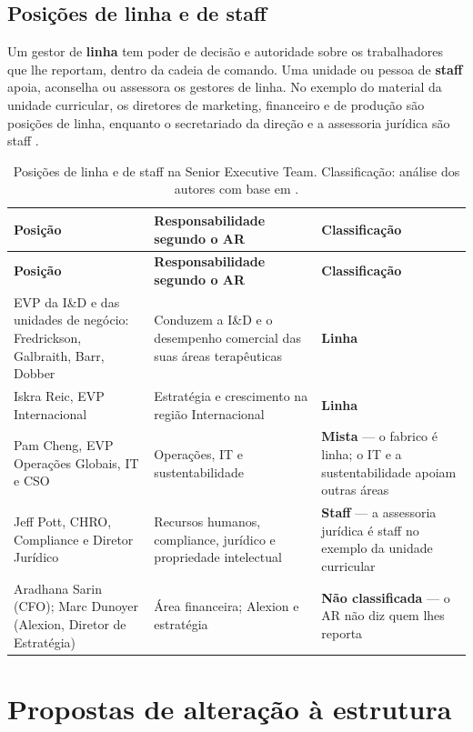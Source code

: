 \subsection{Posições de linha e de staff}

Um gestor de \textbf{linha} tem poder de decisão e autoridade sobre os trabalhadores que lhe reportam, dentro da cadeia de comando. Uma unidade ou pessoa de \textbf{staff} apoia, aconselha ou assessora os gestores de linha. No exemplo do material da unidade curricular, os diretores de marketing, financeiro e de produção são posições de linha, enquanto o secretariado da direção e a assessoria jurídica são staff \cite[p.~8]{ORG}.

\begin{xltabular}{\linewidth}{@{}YYY@{}}
\caption{Posições de linha e de staff na Senior Executive Team. Classificação: análise dos autores com base em \cite[p.~8]{ORG}.}\label{tab:linha-staff}\\*
\toprule
\textbf{Posição} & \textbf{Responsabilidade segundo o AR} & \textbf{Classificação} \\*
\midrule
\endfirsthead
\toprule
\textbf{Posição} & \textbf{Responsabilidade segundo o AR} & \textbf{Classificação} \\*
\midrule
\endhead
\bottomrule
\endfoot
EVP da I\&D e das unidades de negócio: Fredrickson, Galbraith, Barr, Dobber & Conduzem a I\&D e o desempenho comercial das suas áreas terapêuticas \cite[p.~70]{AR} & \textbf{Linha} \\
Iskra Reic, EVP Internacional & Estratégia e crescimento na região Internacional \cite[p.~70]{AR} & \textbf{Linha} \\
Pam Cheng, EVP Operações Globais, IT e CSO & Operações, IT e sustentabilidade \cite[p.~70]{AR} & \textbf{Mista} --- o fabrico é linha; o IT e a sustentabilidade apoiam outras áreas \\
Jeff Pott, CHRO, Compliance e Diretor Jurídico & Recursos humanos, compliance, jurídico e propriedade intelectual \cite[p.~70]{AR} & \textbf{Staff} --- a assessoria jurídica é staff no exemplo da unidade curricular \\
Aradhana Sarin (CFO); Marc Dunoyer (Alexion, Diretor de Estratégia) & Área financeira; Alexion e estratégia \cite[p.~70]{AR} & \textbf{Não classificada} --- o AR não diz quem lhes reporta \\
\end{xltabular}

\section{Propostas de alteração à estrutura}

